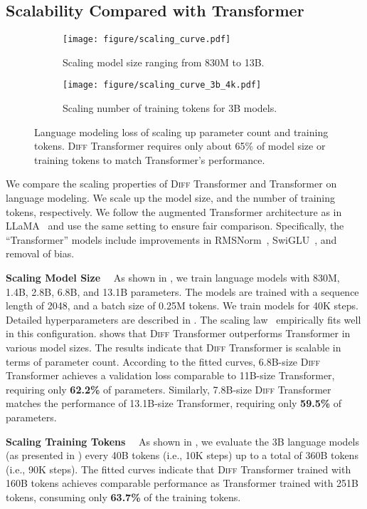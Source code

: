 \documentclass{article}
\newcommand{\mypara}[1]{\textbf{#1}~~}
\newcommand\diff{\textsc{Diff} Transformer}
\begin{document}
\subsection{Scalability Compared with Transformer}
\label{sec:scaling}

\begin{figure}[t]
\centering
\begin{subfigure}{0.45\textwidth}
\texttt{[image: figure/scaling\_curve.pdf]}
\caption{Scaling model size ranging from 830M to 13B.}
\label{fig:scaling_size}
\end{subfigure}
\hfill
\begin{subfigure}{0.48\textwidth}
\texttt{[image: figure/scaling\_curve\_3b\_4k.pdf]}
\caption{Scaling number of training tokens for 3B models.}
\label{fig:scaling_tokens}
\end{subfigure}
\caption{Language modeling loss of scaling up parameter count and training tokens.
\diff{} requires only about {65\%} of model size or training tokens to match Transformer's performance.
}
\label{fig:scaling}
\end{figure}


We compare the scaling properties of \diff{} and Transformer on language modeling.
We scale up the model size, and the number of training tokens, respectively.
We follow the augmented Transformer architecture as in LLaMA~\citep{llama} and use the same setting to ensure fair comparison.
Specifically, the ``Transformer'' models include improvements in RMSNorm~\citep{rmsnorm}, SwiGLU~\citep{glu,swish}, and removal of bias.

\mypara{Scaling Model Size}
As shown in , we train language models with 830M, 1.4B, 2.8B, 6.8B, and 13.1B parameters.
The models are trained with a sequence length of 2048, and a batch size of 0.25M tokens.
We train models for 40K steps.
Detailed hyperparameters are described in .
The scaling law~\citep{scaling:law} empirically fits well in this configuration.
 shows that \diff{} outperforms Transformer in various model sizes.
The results indicate that \diff{} is scalable in terms of parameter count.
According to the fitted curves, 6.8B-size \diff{} achieves a validation loss comparable to 11B-size Transformer, requiring only \textbf{62.2\%} of parameters.
Similarly, 7.8B-size \diff{} matches the performance of 13.1B-size Transformer, requiring only \textbf{59.5\%} of parameters.

\mypara{Scaling Training Tokens}
As shown in , we evaluate the 3B language models (as presented in ) every 40B tokens (i.e., 10K steps) up to a total of 360B tokens (i.e., 90K steps).
The fitted curves indicate that \diff{} trained with 160B tokens achieves comparable performance as Transformer trained with 251B tokens, consuming only \textbf{63.7\%} of the training tokens.
\end{document}
